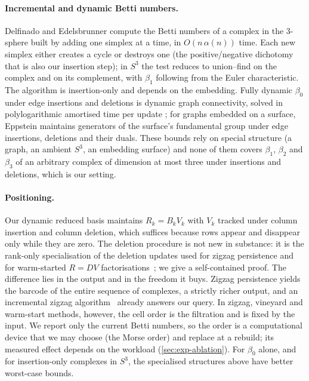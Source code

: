 \paragraph{Incremental and dynamic Betti numbers.}
Delfinado and Edelsbrunner \cite{delfinado1995incremental} compute the Betti
numbers of a complex in the 3-sphere built by adding one simplex at a time,
in $O(n\,\alpha(n))$ time. Each new simplex either creates a cycle or destroys
one (the positive/negative dichotomy that is also our insertion step); in
$S^3$ the test reduces to union--find on the complex and on its complement,
with $\beta_1$ following from the Euler characteristic. The algorithm is
insertion-only and depends on the embedding. Fully dynamic $\beta_0$ under
edge insertions and deletions is dynamic graph connectivity, solved in
polylogarithmic amortised time per update \cite{holm2001polylog}; for graphs
embedded on a surface, Eppstein \cite{eppstein2003dynamic} maintains
generators of the surface's fundamental group under edge insertions,
deletions and their duals. These bounds rely on special structure (a graph,
an ambient $S^3$, an embedding surface) and none of them covers $\beta_1$,
$\beta_2$ and $\beta_3$ of an arbitrary complex of dimension at most three
under insertions and deletions, which is our setting.

\paragraph{Positioning.}
Our dynamic reduced basis maintains $R_k=B_kV_k$ with $V_k$ tracked under column
insertion and column deletion, which suffices because rows appear and disappear
only while they are zero. The deletion procedure is not new in substance: it is
the rank-only specialisation of the deletion updates used for zigzag persistence
and for warm-started $R=DV$
factorisations~\cite{carlsson2009zigzag,luo2023warmstart,giunti2026pruning}; we
give a self-contained proof. The difference lies in the output and in the
freedom it buys. Zigzag persistence yields the barcode of the entire sequence of
complexes, a strictly richer output, and an incremental zigzag
algorithm~\cite{carlsson2009zigzag} already answers our query. In zigzag,
vineyard and warm-start methods, however, the cell order is the filtration and
is fixed by the input. We report only the current Betti numbers, so the order is
a computational device that we may choose (the Morse order) and replace at a
rebuild; its measured effect depends on the workload (\cref{sec:exp-ablation}). For $\beta_0$ alone, and
for insertion-only complexes in $S^3$, the specialised structures above have
better worst-case bounds.

